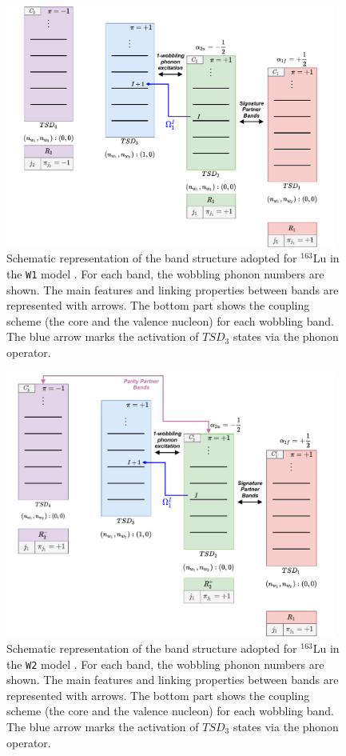 \documentclass[myclassdoc,debug]{rjparticle}
\begin{document}
\begin{figure}[ht]
    \centering
    \includegraphics[width=0.97\textwidth]{figs/W1_Approach.pdf}
    \caption{Schematic representation of the band structure adopted for $^{163}$Lu in the \texttt{W1} model \cite{raduta2020approach,raduta2020towards}. For each band, the wobbling phonon numbers are shown. The main features and linking properties between bands are represented with arrows. The bottom part shows the coupling scheme (the core and the valence nucleon) for each wobbling band. The blue arrow marks the activation of $TSD_3$ states via the phonon operator.}
    \label{w1-model-worfklow}
\end{figure}
\begin{figure}[ht]
  \centering
    \includegraphics[width=0.97\textwidth]{figs/W2_Approach.pdf}
    \caption{Schematic representation of the band structure adopted for $^{163}$Lu in the \texttt{W2} model \cite{poenaru2021parity}. For each band, the wobbling phonon numbers are shown. The main features and linking properties between bands are represented with arrows. The bottom part shows the coupling scheme (the core and the valence nucleon) for each wobbling band. The blue arrow marks the activation of $TSD_3$ states via the phonon operator.}
    \label{w2-model-worfklow}
\end{figure}
\end{document}
